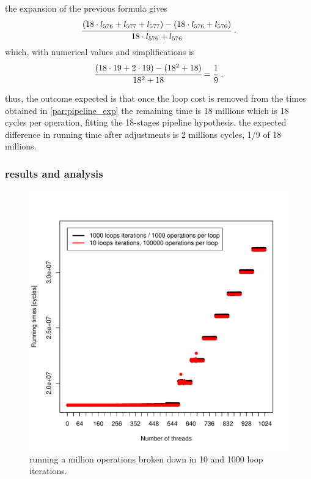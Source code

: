 \documentclass{report}
\def \scalingfactor{.8}
\begin{document}
    the expansion of the previous formula gives
    \[ \cfrac{(18\cdot l_{576} + l_{577} + l_{577}) - (18\cdot l_{576} + l_{576})}{18\cdot l_{576} + l_{576}} \text{  .}\]
    which, with numerical values and simplifications is
    \[ \cfrac{(18\cdot 19 + 2\cdot 19) - (18^2 + 18)}{18^2 + 18} = \cfrac{1}{9}\text{  .}\] 

    thus, the outcome expected is that once the loop cost is removed from the 
    times obtained in \ref{par:pipeline_exp} the remaining time is 18 millions
    which is 18 cycles per operation, fitting the 18-stages pipeline hypothesis.
    the expected difference in running time after adjustments is 2 millions cycles,
    1/9 of 18 millions.

	\subsubsection{results and analysis}
    \begin{figure}[h]
		\centering
		\vspace{-20pt}
    			\includegraphics[width=\scalingfactor\linewidth]{"graphics/for-sizes-superpositions"}
		\vspace{-15pt}
		\captionsetup{justification=centering}
		\caption{running a million operations broken down in 10 and 1000 loop iterations.}
        \label{fig:for-cost}
	\end{figure}
    
\end{document}
